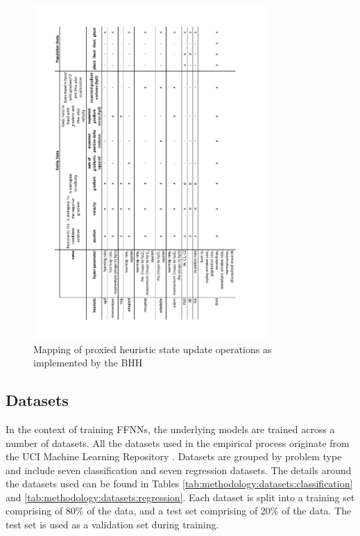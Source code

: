 \begin{figure}[htbp]
	\centering
	\includegraphics[width=0.8\textwidth]{images/bhh_heuristic_proxies.pdf}
	\caption{Mapping of proxied heuristic state update operations as implemented by the \acs{BHH}}
	\label{fig:methodology:heuristics:proxies}%
\end{figure}


\subsection{Datasets}\label{sec:methodology:datasets}

In the context of training \acp{FFNN}, the underlying models are trained across a number of datasets. All the datasets used in the empirical process originate from the UCI Machine Learning Repository \cite{ref:uci:2022}. Datasets are grouped by problem type and include seven classification and seven regression datasets. The details around the datasets used can be found in Tables \ref{tab:methodology:datasets:classification} and \ref{tab:methodology:datasets:regression}. Each dataset is split into a training set comprising of 80\% of the data, and a test set comprising of 20\% of the data. The test set is used as a validation set during training.

